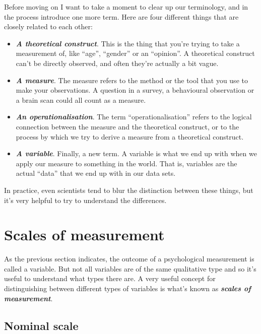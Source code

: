 \documentclass[
]{book}
\providecommand{\tightlist}{%
  \setlength{\itemsep}{0pt}\setlength{\parskip}{0pt}}
\begin{document}
Before moving on I want to take a moment to clear up our terminology, and in the process introduce one more term. Here are four different things that are closely related to each other:

\begin{itemize}
\tightlist
\item
  \textbf{\emph{A theoretical construct}}. This is the thing that you're trying to take a measurement of, like ``age'', ``gender'' or an ``opinion''. A theoretical construct can't be directly observed, and often they're actually a bit vague.
\item
  \textbf{\emph{A measure}}. The measure refers to the method or the tool that you use to make your observations. A question in a survey, a behavioural observation or a brain scan could all count as a measure.
\item
  \textbf{\emph{An operationalisation}}. The term ``operationalisation'' refers to the logical connection between the measure and the theoretical construct, or to the process by which we try to derive a measure from a theoretical construct.
\item
  \textbf{\emph{A variable}}. Finally, a new term. A variable is what we end up with when we apply our measure to something in the world. That is, variables are the actual ``data'' that we end up with in our data sets.
\end{itemize}

In practice, even scientists tend to blur the distinction between these things, but it's very helpful to try to understand the differences.

\hypertarget{scales}{%
\section{Scales of measurement}\label{scales}}

As the previous section indicates, the outcome of a psychological measurement is called a variable. But not all variables are of the same qualitative type and so it's useful to understand what types there are. A very useful concept for distinguishing between different types of variables is what's known as \textbf{\emph{scales of measurement}}.

\hypertarget{nominal-scale}{%
\subsection{Nominal scale}\label{nominal-scale}}
\end{document}

